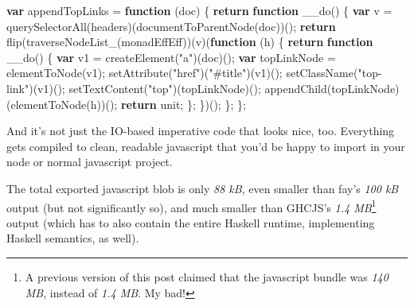 \documentclass[]{article}
\newenvironment{Shaded}{}{}
\newcommand{\KeywordTok}[1]{\textcolor[rgb]{0.00,0.44,0.13}{\textbf{{#1}}}}
\newcommand{\StringTok}[1]{\textcolor[rgb]{0.25,0.44,0.63}{{#1}}}
\newcommand{\ControlFlowTok}[1]{\textcolor[rgb]{0.00,0.44,0.13}{\textbf{{#1}}}}
\newcommand{\OperatorTok}[1]{\textcolor[rgb]{0.40,0.40,0.40}{{#1}}}
\newcommand{\AttributeTok}[1]{\textcolor[rgb]{0.49,0.56,0.16}{{#1}}}
\newcommand{\NormalTok}[1]{{#1}}
\begin{document}
\begin{Shaded}
\begin{Highlighting}[]
\KeywordTok{var} \NormalTok{appendTopLinks }\OperatorTok{=} \KeywordTok{function} \NormalTok{(doc) }\OperatorTok{\{}
    \ControlFlowTok{return} \KeywordTok{function} \AttributeTok{__do}\NormalTok{() }\OperatorTok{\{}
        \KeywordTok{var} \NormalTok{v }\OperatorTok{=} \AttributeTok{querySelectorAll}\NormalTok{(headers)(}\AttributeTok{documentToParentNode}\NormalTok{(doc))()}\OperatorTok{;}
        \ControlFlowTok{return} \AttributeTok{flip}\NormalTok{(}\AttributeTok{traverseNodeList_}\NormalTok{(monadEffEff))(v)(}\KeywordTok{function} \NormalTok{(h) }\OperatorTok{\{}
            \ControlFlowTok{return} \KeywordTok{function} \AttributeTok{__do}\NormalTok{() }\OperatorTok{\{}
                \KeywordTok{var} \NormalTok{v1 }\OperatorTok{=} \AttributeTok{createElement}\NormalTok{(}\StringTok{"a"}\NormalTok{)(doc)()}\OperatorTok{;}
                \KeywordTok{var} \NormalTok{topLinkNode }\OperatorTok{=} \AttributeTok{elementToNode}\NormalTok{(v1)}\OperatorTok{;}
                \AttributeTok{setAttribute}\NormalTok{(}\StringTok{"href"}\NormalTok{)(}\StringTok{"#title"}\NormalTok{)(v1)()}\OperatorTok{;}
                \AttributeTok{setClassName}\NormalTok{(}\StringTok{"top-link"}\NormalTok{)(v1)()}\OperatorTok{;}
                \AttributeTok{setTextContent}\NormalTok{(}\StringTok{"top"}\NormalTok{)(topLinkNode)()}\OperatorTok{;}
                \AttributeTok{appendChild}\NormalTok{(topLinkNode)(}\AttributeTok{elementToNode}\NormalTok{(h))()}\OperatorTok{;}
                \ControlFlowTok{return} \NormalTok{unit}\OperatorTok{;}
            \OperatorTok{\};}
        \OperatorTok{\}}\NormalTok{)()}\OperatorTok{;}
    \OperatorTok{\};}
\OperatorTok{\};}
\end{Highlighting}
\end{Shaded}

And it's not just the IO-based imperative code that looks nice, too.
Everything gets compiled to clean, readable javascript that you'd be
happy to import in your node or normal javascript project.

The total exported javascript blob is only \emph{88 kB}, even smaller
than fay's \emph{100 kB} output (but not significantly so), and much
smaller than GHCJS's \emph{1.4 MB}\footnote{A previous version of this
  post claimed that the javascript bundle was \emph{140 MB}, instead of
  \emph{1.4 MB}. My bad!} output (which has to also contain the entire
Haskell runtime, implementing Haskell semantics, as well).
\end{document}
